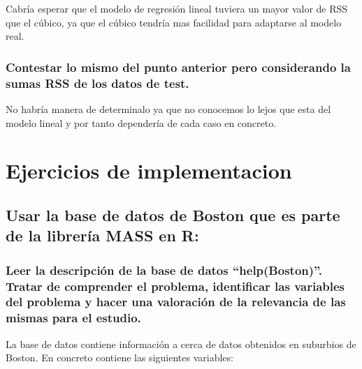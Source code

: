 Cabría esperar que el modelo de regresión lineal tuviera un mayor valor de RSS que el cúbico, ya que el cúbico tendría mas facilidad para adaptarse al modelo real.

\subsubsection{Contestar lo mismo del punto anterior pero considerando la sumas RSS de los datos de test.}

No habría manera de determinalo ya que no conocemos lo lejos que esta del modelo lineal y por tanto dependería de cada caso en concreto.

\newpage
\section{Ejercicios de implementacion}

\subsection{Usar la base de datos de Boston que es parte de la librería MASS en R:}

\subsubsection{Leer la descripción de la base de datos “help(Boston)”. Tratar de comprender el problema, identificar las variables del problema y hacer una valoración de la relevancia de las mismas para el estudio.}

La base de datos contiene información a cerca de datos obtenidos en suburbios de Boston. En concreto contiene las siguientes variables:

